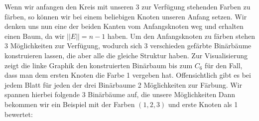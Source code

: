         Wenn wir anfangen den Kreis mit unseren 3 zur Verfügung stehenden Farben zu färben, so können wir bei einem beliebigen Knoten unseren Anfang setzen. Wir denken uns nun eine der beiden Kanten vom Anfangsknoten weg und erhalten einen Baum, da wir $||E|| = n-1$ haben. Um den Anfangsknoten zu färben stehen 3 Möglichkeiten zur Verfügung, wodurch sich 3 verschieden gefärbte Binärbäume konstruieren lassen, die aber alle die gleiche Struktur haben. Zur Visualisierung zeigt die linke Graphik den konstruierten Binärbaum bis zum $C_6$ für den Fall, dass man dem ersten Knoten die Farbe 1 vergeben hat. Offensichtlich gibt es bei jedem Blatt für jeden der drei Binärbaume 2 
        Möglichkeiten zur Färbung. Wir spannen hierbei folgende 3 Binärbäume auf, die unsere Möglichkeiten  
        Dann bekommen wir ein Beispiel mit der Farben $(1,2,3)$ und erste Knoten als 1 bewertet:
